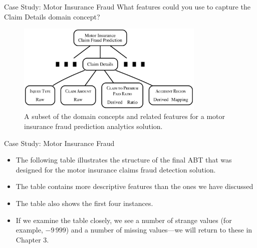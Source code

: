 \documentclass[xcolor={table}]{beamer}
\begin{document}
 \begin{frame} [plain]
 \begin{block}{Case Study: Motor Insurance Fraud}
What features could you use to capture the Claim Details domain concept?
\begin{figure}[htb]
	\begin{center}
			\includegraphics[width=0.8\textwidth]{./images/motorInsurance4_SMCAPS.pdf}
	\end{center}
	\caption{A subset of the domain concepts and related features for a motor insurance fraud prediction analytics solution.}
	\label{fig:metricExample3}
\end{figure}
\end{block}
\end{frame} 


\begin{frame}
 \begin{block}{Case Study: Motor Insurance Fraud}
\begin{itemize}
\item The following table illustrates the structure of the final ABT that was designed for the motor insurance claims fraud detection solution. 
\item The table contains more descriptive features than the ones we have discussed
\item The table also shows the first four instances. 
\item If we examine the table closely, we see a number of strange values (for example, $-9\,999$) and a number of missing values---we will return to these in Chapter 3.
\end{itemize}
\end{block}
\end{frame}
\end{document}
